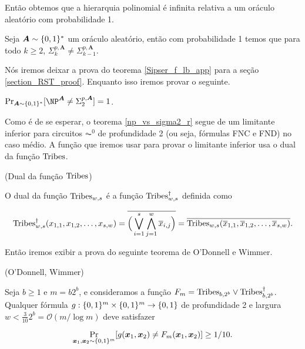 Então obtemos que a hierarquia polinomial é infinita relativa a um oráculo aleatório com probabilidade 1.

\begin{teo} \label{ph_no_collapse_random}
    Seja $\boldsymbol{A} \sim \{0, 1\}^{*}$ um oráculo aleatório, então com probabilidade 1 temos que para todo $k \geq 2$, $\Sigma_{k}^{p, \boldsymbol{A}} \neq \Sigma_{k - 1}^{p, \boldsymbol{A}}$.    
\end{teo}

Nós iremos deixar a prova do teorema \ref{Sipser_f_lb_app} para a seção \ref{section_RST_proof}. Enquanto isso iremos provar o seguinte.

\begin{teo} \label{np_vs_sigma2_r}
	$\Pr_{\boldsymbol{A} \sim \binalph^{*}}[\NP^{\boldsymbol{A}} \neq \Sigma_{2}^{p, \boldsymbol{A}}] = 1$.
\end{teo}

Como é de se esperar, o teorema \ref{np_vs_sigma2_r} segue de um limitante inferior para circuitos $\AC^{0}$ de profundidade 2 (ou seja, fórmulas FNC e FND) no caso médio. A função que iremos usar para provar o limitante inferior usa o dual da função $\text{Tribes}$.

\begin{defi} (Dual da função $\text{Tribes}$)

O dual da função $\text{Tribes}_{w, s}$ é a função $\text{Tribes}_{w, s}^{\dagger}$ definida como

\begin{equation*}
	\text{Tribes}_{w, s}^{\dagger}(x_{1, 1}, x_{1,2}, \dots, x_{s, w})  = \overline{\Big(\bigvee_{i = 1}^{s}\bigwedge_{j = 1}^{w} \overline{x}_{i, j}\Big)} = \overline{\text{Tribes}_{w, s}(\overline{x}_{1, 1}, \overline{x}_{1, 2}, \dots, \overline{x}_{s, w})}.
\end{equation*}

\end{defi}

Então iremos exibir a prova do seguinte teorema de O'Donnell e Wimmer.

\begin{teo} (O'Donnell, Wimmer) \label{odonnell_wimmer}

Seja $b \geq 1$ e $m = b2^{b}$, e consideramos a função $F_{m} = \text{Tribes}_{b, 2^{b}} \lor \text{Tribes}_{b, 2^{b}}^{\dagger}$. Qualquer fórmula $g: \{0, 1\}^{m} \times \{0, 1\}^{m} \to \{0, 1\}$ de profundidade 2 e largura $w < \frac{3}{10}2^{b} = \mathcal{O}(m/\log m)$ deve satisfazer

\begin{equation*}
    \Pr_{\boldsymbol{x}_{1}, \boldsymbol{x}_{2} \sim \{0, 1\}^{m}}[g(\boldsymbol{x}_{1}, \boldsymbol{x}_{2}) \neq F_{m}(\boldsymbol{x}_{1}, \boldsymbol{x}_{2})] \geq 1/10.
\end{equation*}

\end{teo}

